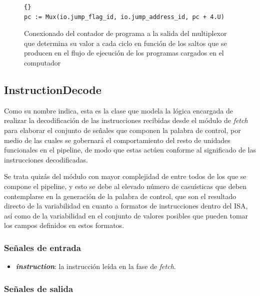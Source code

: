 \vspace{+0.3cm}
\begin{figure}[h]
  \centering
  \begin{minipage}{0.9\linewidth}
    \begin{lstlisting}[style=scalaStyle]{}
pc := Mux(io.jump_flag_id, io.jump_address_id, pc + 4.U)
    \end{lstlisting}
    \caption{Conexionado del contador de programa a la salida del multiplexor que determina su valor a cada ciclo en función de los saltos que se producen en el flujo de ejecución de los programas cargados en el computador}
  \end{minipage}
\end{figure}

\subsection{InstructionDecode}

Como su nombre indica, esta es la clase que modela la lógica encargada de realizar la decodificación de las instrucciones recibidas desde el módulo de \textit{fetch} para elaborar el conjunto de señales que componen la palabra de control, por medio de las cuales se gobernará el comportamiento del resto de unidades funcionales en el pipeline, de modo que estas actúen conforme al significado de las instrucciones decodificadas.

Se trata quizás del módulo con mayor complejidad de entre todos de los que se compone el pipeline, y esto se debe al elevado número de casuísticas que deben contemplarse en la generación de la palabra de control, que son el resultado directo de la variabilidad en cuanto a formatos de instrucciones dentro del ISA, así como de la variabilidad en el conjunto de valores posibles que pueden tomar los campos definidos en estos formatos.

\subsubsection{Señales de entrada}

\begin{itemize}
  \item \textbf{\textit{instruction}}: la instrucción leída en la fase de \textit{fetch}.
\end{itemize}

\subsubsection{Señales de salida}

